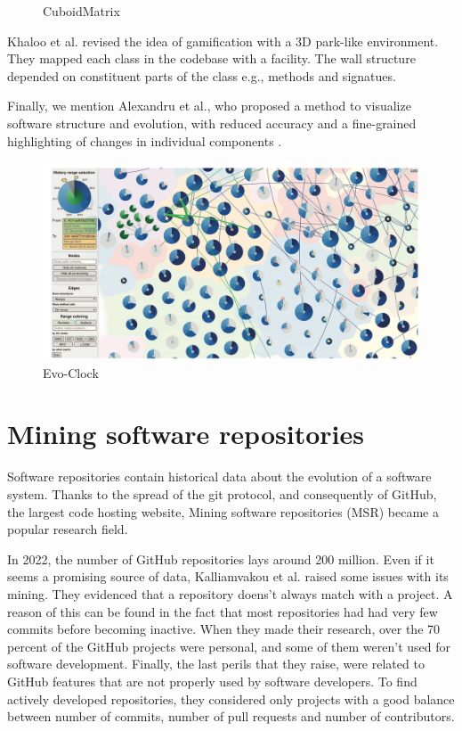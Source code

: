 \begin{figure}[H]
    \caption{CuboidMatrix}
  \endminipage
  \end{figure}
  


Khaloo et al. \cite{Khaloo2017} revised the idea of gamification with a 3D park-like environment.
 They mapped each class in the codebase with a facility. The wall structure depended on constituent parts of the class e.g., methods and signatues. 

Finally, we mention Alexandru et al., who proposed a method to visualize software structure and evolution, 
with reduced accuracy and a fine-grained highlighting of changes in individual components \cite{Alexandru2019}. 

\begin{figure}[H]
  \includegraphics[width=0.9\linewidth]{Alexandru_EvoClock.png} 
  \caption{Evo-Clock}
\end{figure}


\section{Mining software repositories}

Software repositories contain historical data about the evolution of a software system. 
Thanks to the spread of the git protocol, and consequently of GitHub, the largest code hosting website, 
Mining software repositories (MSR) became a popular research field. 

In 2022, the number of GitHub repositories lays around 200 million.
Even if it seems a promising source of data, Kalliamvakou et al. \cite{Kalliamvakou2014} raised some issues with its mining.
They evidenced that a repository doens't always match with a project. 
A reason of this can be found in the fact that most repositories had had very few commits before becoming inactive.
When they made their research, over the 70 percent of the GitHub projects were personal, and some of them weren't used for software development. 
Finally, the last perils that they raise, were related to GitHub features that are not properly used by software developers.
To find actively developed repositories, they considered only projects with a good balance between number of commits, 
number of pull requests and number of contributors. 


